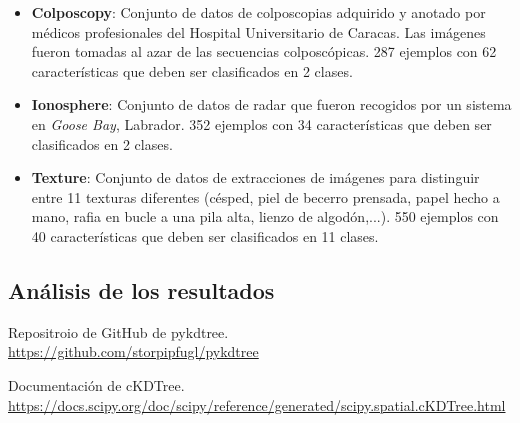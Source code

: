 \documentclass[11pt,a4paper]{article}
\begin{document}
\begin{itemize}[label=\textbullet]
	\item \textbf{Colposcopy}: Conjunto de datos de colposcopias adquirido y anotado por médicos profesionales del Hospital
	Universitario de Caracas. Las imágenes fueron tomadas al azar de las secuencias colposcópicas. 287 ejemplos con 62
	características que deben ser clasificados en 2 clases.
	\item \textbf{Ionosphere}: Conjunto de datos de radar que fueron recogidos por un sistema en \textit{Goose Bay},
	Labrador. 352 ejemplos con 34 características que deben ser clasificados en 2 clases.
	\item \textbf{Texture}: Conjunto de datos de extracciones de imágenes para distinguir entre 11 texturas diferentes
	(césped, piel de becerro prensada, papel hecho a mano, rafia en bucle a una pila alta, lienzo de algodón,...). 550
	ejemplos con 40 características que deben ser clasificados en 11 clases.
\end{itemize}

\subsection{Análisis de los resultados}

\newpage

\begin{thebibliography}{5}

Repositroio de GitHub de pykdtree.
\\\url{https://github.com/storpipfugl/pykdtree}

Documentación de cKDTree.
\\\url{https://docs.scipy.org/doc/scipy/reference/generated/scipy.spatial.cKDTree.html}

\end{thebibliography}
\end{document}
